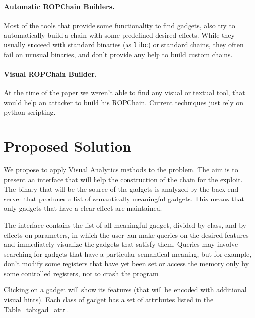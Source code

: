 \documentclass[twocolumn, 11pt]{article}
\begin{document}
\paragraph{Automatic ROPChain Builders.} Most of the tools that provide some functionality to find gadgets, also try to automatically build a chain with some predefined desired effects. While they usually succeed with standard binaries (as {\tt libc}) or standard chains, they often fail on unusual binaries, and don't provide any help to build custom chains.

\paragraph{Visual ROPChain Builder.} At the time of the paper we weren't able to find any visual or textual tool, that would help an attacker to build his ROPChain. Current techniques just rely on python scripting.

\section{Proposed Solution}

We propose to apply Visual Analytics methods to the problem. The aim is to present an interface that will help the construction of the chain for the exploit.
The binary that will be the source of the gadgets is analyzed by the back-end server that produces a list of semantically meaningful gadgets. This means that only gadgets that have a clear effect are maintained.

The interface contains the list of all meaningful gadget, divided by class, and by effects on parameters, in which the user can make queries on the desired features and immediately visualize the gadgets that satisfy them.
Queries may involve searching for gadgets that have a particular semantical meaning, but for example, don't modify some registers that have yet been set or access the memory only by some controlled registers, not to crash the program.

Clicking on a gadget will show its features (that will be encoded with additional visual hints). Each class of gadget has a set of attributes listed in the Table~\ref{tab:gad_attr}.

\bigskip
\end{document}

